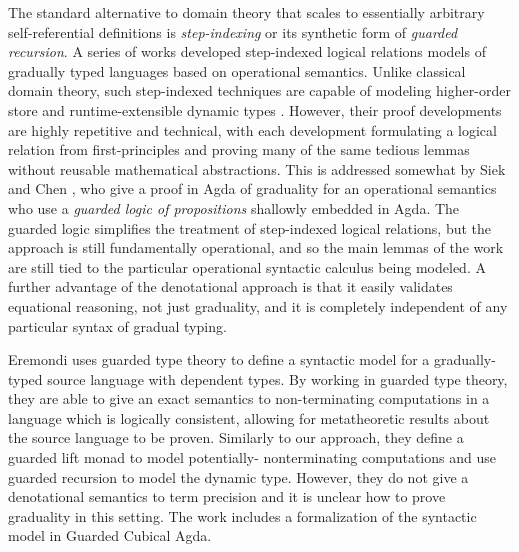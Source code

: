 The standard alternative to domain theory that scales to essentially
arbitrary self-referential definitions is \emph{step-indexing} or its
synthetic form of \emph{guarded recursion}. A series of works
\cite{new-ahmed2018, new-licata-ahmed2019, new-jamner-ahmed19}
developed step-indexed logical relations models of gradually typed
languages based on operational semantics. Unlike classical domain
theory, such step-indexed techniques are capable of modeling
higher-order store and runtime-extensible dynamic types
\cite{appelmcallester01,ahmed06,neis09,new-jamner-ahmed19}. However,
their proof developments are highly repetitive and technical, with
each development formulating a logical relation from first-principles
and proving many of the same tedious lemmas without reusable
mathematical abstractions.
%
%
This is addressed somewhat by Siek and Chen
\cite{siek-chen2021}, who give a proof in Agda of graduality for an
operational semantics who use a \emph{guarded logic of propositions}
shallowly embedded in Agda. The guarded logic simplifies the treatment
of step-indexed logical relations, but the approach is still
fundamentally operational, and so the main lemmas of the work are
still tied to the particular operational syntactic calculus being
modeled. A further advantage of the denotational approach is that it
easily validates equational reasoning, not just graduality, and it is
completely independent of any particular syntax of gradual typing.


Eremondi \cite{Eremondi_2023} uses guarded type theory to
define a syntactic model for a gradually-typed source
language with dependent types. By working in guarded type theory, they are
able to give an exact semantics to non-terminating computations in a language
which is logically consistent, allowing for metatheoretic results about the
source language to be proven.
%
Similarly to our approach, they define a guarded lift monad to model potentially-
nonterminating computations and use guarded recursion to model the dynamic type.
However, they do not give a denotational semantics to term precision and it is unclear
how to prove graduality in this setting.
The work includes a formalization of the syntactic model in Guarded Cubical Agda.

